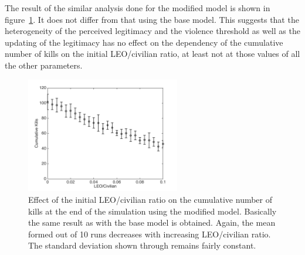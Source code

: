 \documentclass[11pt]{article}
\begin{document}
The result of the similar analysis done for the modified model is shown in figure~\ref{fig:LEO_civ_modified}. It does not differ from that using the base model. This suggests that the heterogeneity of the perceived legitimacy and the violence threshold as well as the updating of the legitimacy has no effect on the dependency of the cumulative number of kills on the initial LEO/civilian ratio, at least not at those values of all the other parameters. 
\begin{figure}[!htbp]
	\centering
		\includegraphics[width=0.6\textwidth]{../../code/modified_model/cum_kills_vs_LEO_civ.png}
	\caption{Effect of the initial LEO/civilian ratio on the cumulative number of kills at the end of the simulation using the modified model. Basically the same result as with the base model is obtained. Again, the mean formed out of 10 runs decreases with increasing LEO/civilian ratio. The standard deviation shown through remains fairly constant.}
	\label{fig:LEO_civ_modified}
\end{figure}
\end{document}
